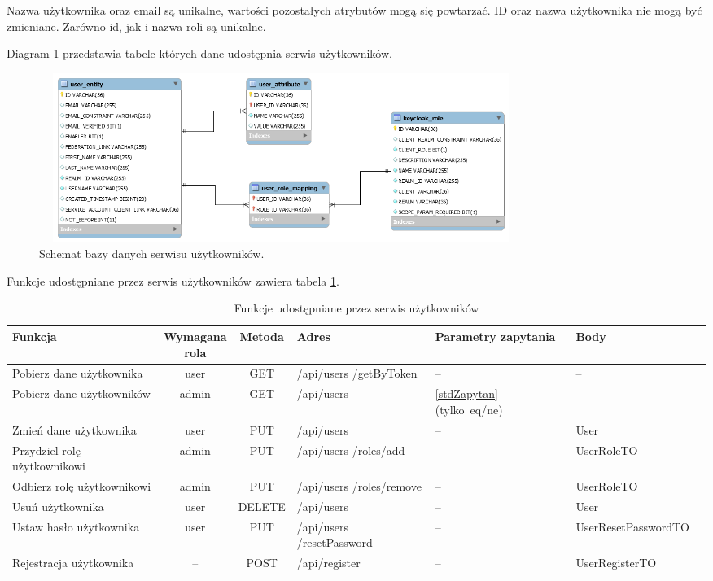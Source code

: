 \documentclass[11pt,a4paper,twoside]{article}
\begin{document}
Nazwa użytkownika oraz email są unikalne, wartości pozostałych atrybutów mogą się powtarzać. ID oraz nazwa użytkownika nie mogą być zmieniane. Zarówno id, jak i nazwa roli są unikalne.

Diagram \ref{userDB} przedstawia tabele których dane udostępnia serwis użytkowników.

\begin{figure}[ht]
\caption{Schemat bazy danych serwisu użytkowników.}
\label{userDB}
\centering
\includegraphics[height=5.5cm, width=15.7cm]{userDB}
\end{figure}

Funkcje udostępniane przez serwis użytkowników zawiera tabela \ref{funkcjeUserWebservice}.
\begin{table}[ht]
\caption{Funkcje udostępniane przez serwis użytkowników}
\label{funkcjeUserWebservice}
\centering
\begin{tabularx}{\textwidth}{|X|c|c|X|X|X|c|}
\hline
 Funkcja & \makecell{Wymagana \\ rola} & Metoda & Adres & Parametry zapytania & Body \\\hline
 Pobierz dane użytkownika & user & GET & /api/users /getByToken & -- & -- \\\hline
 Pobierz dane użytkowników & admin & GET & /api/users & \ref{stdZapytan} \mbox{(tylko eq/ne)} & -- \\\hline
   Zmień dane użytkownika & user & PUT & /api/users & -- & User \\\hline
    Przydziel rolę użytkownikowi & admin & PUT & /api/users /roles/add & -- & UserRoleTO \\\hline
     Odbierz rolę użytkownikowi & admin & PUT & /api/users /roles/remove & -- & UserRoleTO \\\hline
      Usuń użytkownika & user & DELETE & /api/users & -- & User \\\hline
  Ustaw hasło użytkownika & user & PUT & /api/users /resetPassword & -- & UserResetPasswordTO \\\hline
  Rejestracja użytkownika & -- & POST & /api/register & -- & UserRegisterTO \\\hline
\end{tabularx}
\end{table}
\end{document}
